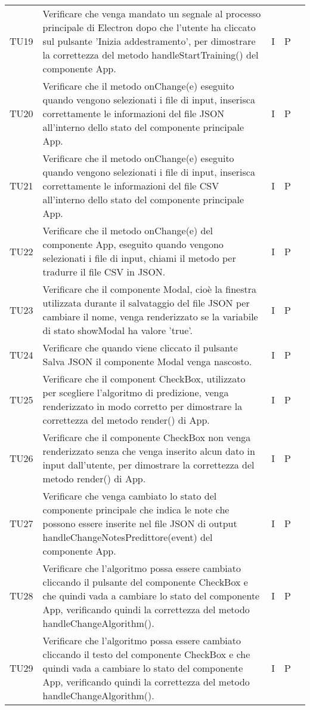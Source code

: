 \begin{longtable} {
		>{}p{15mm} 
		>{}p{79.5mm}
		>{}p{15mm} 
		>{}p{15mm}
		>{}p{0mm}}
	TU19	& Verificare che venga mandato un segnale al processo principale di Electron dopo che l'utente ha cliccato sul pulsante 'Inizia addestramento', per dimostrare la correttezza del metodo handleStartTraining() del componente App. & I & P &\TBstrut \\ [2mm]
	TU20	& Verificare che il metodo onChange(e) eseguito quando vengono selezionati i file di input, inserisca correttamente le informazioni del file JSON all'interno dello stato del componente principale App. & I & P &\TBstrut \\ [2mm]
	TU21	& Verificare che il metodo onChange(e) eseguito quando vengono selezionati i file di input, inserisca correttamente le informazioni del file CSV all'interno dello stato del componente principale App. & I & P &\TBstrut \\ [2mm]
	TU22	& Verificare che il metodo onChange(e) del componente App, eseguito quando vengono selezionati i file di input, chiami il metodo per tradurre il file CSV in JSON. & I & P &\TBstrut \\ [2mm]
	TU23	& Verificare che il componente Modal, cioè la finestra utilizzata durante il salvataggio del file JSON per cambiare il nome, venga renderizzato se la variabile di stato showModal ha valore 'true'. & I & P &\TBstrut \\ [2mm]
	TU24	& Verificare che quando viene cliccato il pulsante Salva JSON il componente Modal venga nascosto. & I & P &\TBstrut \\ [2mm]
	TU25	& Verificare che il component CheckBox, utilizzato per scegliere l'algoritmo di predizione, venga renderizzato in modo corretto per dimostrare la correttezza del metodo render() di App. & I & P &\TBstrut \\ [2mm]
	TU26	& Verificare che il componente CheckBox non venga renderizzato senza che venga inserito alcun dato in input dall'utente, per dimostrare la correttezza del metodo render() di App. & I & P &\TBstrut \\ [2mm]
	TU27	& Verificare che venga cambiato lo stato del componente principale che indica le note che possono essere inserite nel file JSON di output handleChangeNotesPredittore(event) del componente App. & I & P &\TBstrut \\ [2mm]
	TU28	& Verificare che l'algoritmo possa essere cambiato cliccando il pulsante del componente CheckBox e che quindi vada a cambiare lo stato del componente App, verificando quindi la correttezza del metodo handleChangeAlgorithm(). & I & P &\TBstrut \\ [2mm]
	TU29	& Verificare che l'algoritmo possa essere cambiato cliccando il testo del componente CheckBox e che quindi vada a cambiare lo stato del componente App, verificando quindi la correttezza del metodo handleChangeAlgorithm(). & I & P &\TBstrut \\ [2mm]

\end{longtable}
